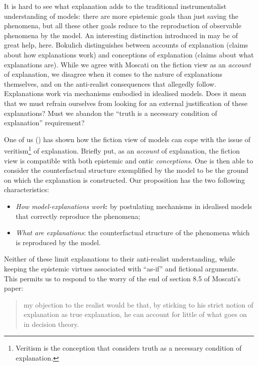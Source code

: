 \documentclass[a4paper,11pt]{article}
\theoremstyle{definition}
\begin{document}
It is hard to see what explanation adds to the traditional instrumentalist understanding of models: there are more epistemic goals than just saving the phenomena, but all these other goals reduce to the reproduction of observable phenomena by the model. An interesting distinction introduced in \citep{Bokulich2018} may be of great help, here. Bokulich distinguishes between accounts of explanation (claims about how explanations work) and conceptions of explanation (claims about what explanations are). While we agree with Moscati on the fiction view as an \textit{account} of explanation, we disagree when it comes to the nature of explanations themselves, and on the anti-realist consequences that allegedly follow. Explanations work via mechanisms embodied in idealised models. Does it mean that we must refrain ourselves from looking for an external justification of these explanations? Must we abandon the ``truth is a necessary condition of explanation'' requirement?

One of us (\citep{Brandelet2023}) has shown how the fiction view of models can cope with the issue of veritism\footnote{Veritism is the conception that considers truth as a necessary condition of explanation.} of explanation. Briefly put, as an \textit{account} of explanation, the fiction view is compatible with both epistemic and ontic \textit{conceptions}. One is then able to consider the counterfactual structure exemplified by the model to be the ground on which the explanation is constructed. Our proposition has the two following characteristics:

\begin{itemize}
    \item \textit{How model-explanations work}: by postulating mechanisms in idealised models that correctly reproduce the phenomena;
    \item \textit{What are explanations}: the counterfactual structure of the phenomena which is reproduced by the model.
\end{itemize}

Neither of these limit explanations to their anti-realist understanding, while keeping the epistemic virtues associated with ``as-if'' and fictional arguments. This permits us to respond to the worry of the end of section 8.5 of Moscati's paper:

\begin{quote}
    my objection to the realist would be that, by sticking to his strict notion of explanation as true explanation, he can account for little of what goes on in decision theory. \citep[p.~22]{Moscati2023}
\end{quote}
\end{document}
